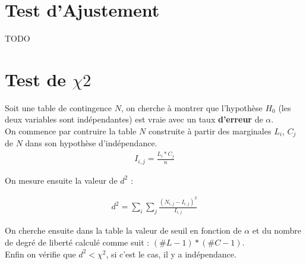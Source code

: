 \documentclass{article}
\begin{document}
\section{Test d'Ajustement}

TODO

\section{Test de $\chi2$}

Soit une table de contingence $N$, on cherche à montrer que l'hypothèse $H_0$ (les deux variables sont indépendantes) est vraie avec un taux \textbf{d'erreur} de $\alpha$. \\
On commence par contruire la table $N$ construite à partir des marginales $L_i$, $C_j$ de $N$ dans son hypothèse d'indépendance. \\

\begin{align*}
    I_{i,j} = \frac{L_i * C_j}{n}
\end{align*}

On mesure ensuite la valeur de $d^2$ : 

\begin{align*}
    d^2 = \sum\limits_i \sum\limits_j \frac{(N_{i,j} - I_{i,j})^2}{I_{i,j}}
\end{align*}

On cherche ensuite dans la table la valeur de seuil en fonction de $\alpha$ et du nombre de degré de liberté calculé comme suit : $(\#L - 1) * (\#C - 1)$.\\
Enfin on vérifie que $d^2 < \chi^2$, si c'est le cas, il y a indépendance. 
\end{document}
